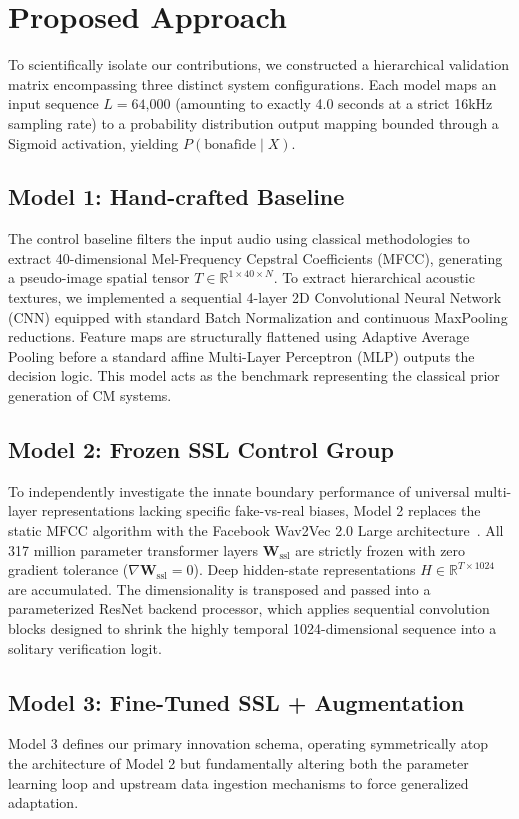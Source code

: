 \documentclass[10pt, twocolumn]{article}
\begin{document}
\section{Proposed Approach}

To scientifically isolate our contributions, we constructed a hierarchical validation matrix encompassing three distinct system configurations. Each model maps an input sequence $L = \text{64,000}$ (amounting to exactly 4.0 seconds at a strict 16kHz sampling rate) to a probability distribution output mapping bounded through a Sigmoid activation, yielding $P(\text{bonafide} \mid X)$.

\subsection{Model 1: Hand-crafted Baseline}
The control baseline filters the input audio using classical methodologies to extract 40-dimensional Mel-Frequency Cepstral Coefficients (MFCC), generating a pseudo-image spatial tensor $T \in \mathbb{R}^{1 \times 40 \times N}$. To extract hierarchical acoustic textures, we implemented a sequential 4-layer 2D Convolutional Neural Network (CNN) equipped with standard Batch Normalization and continuous MaxPooling reductions. Feature maps are structurally flattened using Adaptive Average Pooling before a standard affine Multi-Layer Perceptron (MLP) outputs the decision logic. This model acts as the benchmark representing the classical prior generation of CM systems.

\subsection{Model 2: Frozen SSL Control Group}
To independently investigate the innate boundary performance of universal multi-layer representations lacking specific fake-vs-real biases, Model 2 replaces the static MFCC algorithm with the Facebook Wav2Vec 2.0 Large architecture~\cite{wav2vec2}. All 317 million parameter transformer layers $\mathbf{W}_{\text{ssl}}$ are strictly frozen with zero gradient tolerance ($\nabla \mathbf{W}_{\text{ssl}} = 0$). Deep hidden-state representations $H \in \mathbb{R}^{T \times 1024}$ are accumulated. The dimensionality is transposed and passed into a parameterized ResNet backend processor, which applies sequential convolution blocks designed to shrink the highly temporal 1024-dimensional sequence into a solitary verification logit.

\subsection{Model 3: Fine-Tuned SSL + Augmentation}
Model 3 defines our primary innovation schema, operating symmetrically atop the architecture of Model 2 but fundamentally altering both the parameter learning loop and upstream data ingestion mechanisms to force generalized adaptation.
\end{document}
